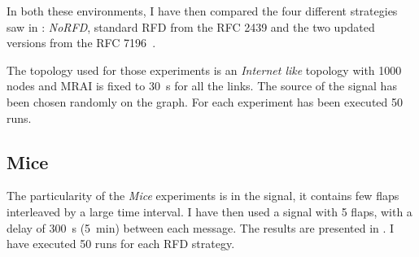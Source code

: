In both these environments, I have then compared the four different strategies
saw in : \textit{NoRFD},
standard \ac{RFD} from the \ac{RFC} \num{2439} and the two updated versions
from the \ac{RFC} \num{7196}~\cite{rfc7196}.

The topology used for those experiments is an \textit{Internet like} topology
with \num{1000} nodes and \ac{MRAI} is fixed to \SI{30}{\second} for all the links.
The source of the signal has been chosen randomly on the graph.
For each experiment has been executed \num{50} runs.


\subsection{Mice}
\label{subsec:rfd_mice}

The particularity of the \textit{Mice} experiments is in the signal, it contains
few flaps interleaved by a large time interval.
I have then used a signal with \num{5} flaps,  with a delay
of \SI{300}{\second} (\SI{5}{\minute}) between each message.
The results are presented in .
I have executed \num{50} runs for each \ac{RFD} strategy.

